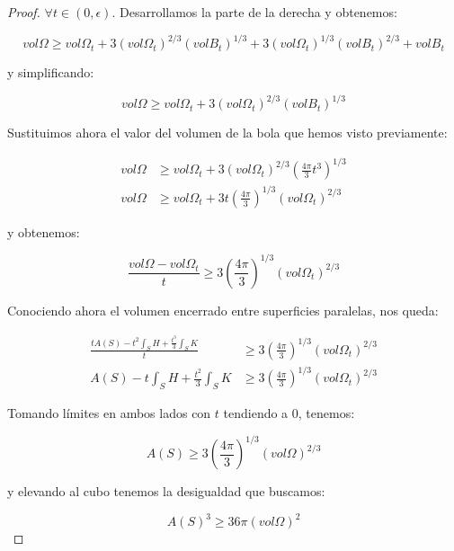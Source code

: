 \begin{proof}
$\forall t \in (0, \epsilon)$. Desarrollamos la parte de la derecha y obtenemos:

\begin{equation*}
    vol \Omega \geq vol \Omega_t + 3(vol \Omega_t)^{2/3}(vol B_t)^{1/3} + 3(vol \Omega_t)^{1/3}(vol B_t)^{2/3} + vol B_t
\end{equation*}

y simplificando:

\begin{equation*}
    vol \Omega \geq vol \Omega_t + 3(vol \Omega_t)^{2/3}(vol B_t)^{1/3}
\end{equation*}

Sustituimos ahora el valor del volumen de la bola que hemos visto previamente:

\begin{align*}
    vol \Omega &\geq vol \Omega_t + 3(vol \Omega_t)^{2/3} \left( \frac{4\pi}{3}t^3 \right)^{1/3} \\
    vol \Omega &\geq vol \Omega_t + 3t \left( \frac{4\pi}{3} \right)^{1/3} (vol \Omega_t)^{2/3}
\end{align*}

y obtenemos:

\begin{equation*}
    \frac{vol \Omega - vol \Omega_t}{t} \geq 3 \left( \frac{4\pi}{3} \right)^{1/3} (vol \Omega_t)^{2/3}
\end{equation*}

Conociendo ahora el volumen encerrado entre superficies paralelas, nos queda:

\begin{align*}
    \frac{tA(S) - t^2\int_S H + \frac{t^3}{3}\int_S K}{t} &\geq 3 \left( \frac{4\pi}{3} \right)^{1/3} (vol \Omega_t)^{2/3} \\
    A(S) - t\int_S H + \frac{t^2}{3}\int_S K &\geq 3 \left( \frac{4\pi}{3} \right)^{1/3} (vol \Omega_t)^{2/3}
\end{align*}

Tomando límites en ambos lados con $t$ tendiendo a 0, tenemos:

\begin{equation*}
    A(S) \geq 3 \left( \frac{4\pi}{3} \right)^{1/3} (vol \Omega)^{2/3}
\end{equation*}

y elevando al cubo tenemos la desigualdad que buscamos:

\begin{equation*}
    A(S)^3 \geq 36\pi(vol \Omega)^2
\end{equation*}
\end{proof}

